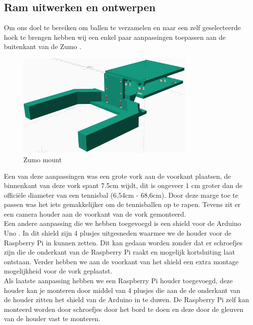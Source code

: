 \subsection{Ram uitwerken en ontwerpen}
Om ons doel te bereiken om ballen te verzamelen en naar een zelf geselecteerde hoek te brengen hebben wij een enkel paar aanpassingen toepassen aan de buitenkant van de Zumo \cite{Zumo-bot}.\\

\begin{figure}[H]
    \centering
    \includegraphics[width=250pt]{img/zumo-mount.png}
    \caption{Zumo mount}
    \label{fig:zumo-mount}
\end{figure}

Een van deze aanpassingen was een grote vork aan de voorkant plaatsen, de binnenkant van deze vork spant 7.5cm wijdt, dit is ongeveer 1 cm groter dan de officiële diameter van een tennisbal (6,54cm - 68,6cm). Door deze marge toe te passen was het iets gemakkelijker om de tennisballen op te rapen. Tevens zit er een camera houder aan de voorkant van de vork gemonteerd. \\

Een andere aanpassing die we hebben toegevoegd is een shield voor de Arduino Uno \cite{Arduino-Uno}. In dit shield zijn 4 plusjes uitgesneden waarmee we de houder voor de Raspberry Pi \cite{Raspberry-Pi} in kunnen zetten. Dit kan gedaan worden zonder dat er schroefjes zijn die de onderkant van de Raspberry Pi raakt en mogelijk kortsluiting laat ontstaan. Verder hebben we aan de voorkant van het shield een extra montage mogelijkheid voor de vork geplaatst.\\

Als laatste aanpassing hebben we een Raspberry Pi houder toegevoegd, deze houder kan je monteren door middel van 4 plusjes die aan de de onderkant van de houder zitten het shield van de Arduino in te duwen. De Raspberry Pi zelf kan monteerd worden door schroefjes door het bord te doen en deze door de gleuven van de houder vast te monteren.

